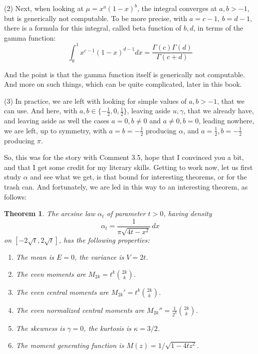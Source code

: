 \documentclass[12pt]{amsbook}
\newtheorem{theorem}{Theorem}[chapter]
\begin{document}
\bigskip

(2) Next, when looking at $\mu=x^a(1-x)^b$, the integral converges at $a,b>-1$, but is generically not computable. To be more precise, with $a=c-1$, $b=d-1$, there is a formula for this integral, called beta function of $b,d$, in terms of the gamma function:
$$\int_0^1x^{c-1}(1-x)^{d-1}dx=\frac{\Gamma(c)\Gamma(d)}{\Gamma(c+d)}$$

And the point is that the gamma function itself is generically not computable. And more on such things, which can be quite complicated, later in this book.

\bigskip

(3) In practice, we are left with looking for simple values of $a,b>-1$, that we can use. And here, with $a,b\in\{-\frac{1}{2},0,\frac{1}{2}\}$, leaving aside $u,\gamma$, that we already have, and leaving aside as well the cases $a=0,b\neq0$ and $a\neq 0,b=0$, leading nowhere, we are left, up to symmetry, with $a=b=-\frac{1}{2}$ producing $\alpha$, and $a=\frac{1}{2},b=-\frac{1}{2}$ producing $\pi$.

\bigskip

So, this was for the story with Comment 3.5, hope that I convinced you a bit, and that I get some credit for my literary skills. Getting to work now, let us first study $\alpha$ and see what we get, is that bound for interesting theorems, or for the trash can. And fortunately, we are led in this way to an interesting theorem, as follows:


\begin{theorem}
The arcsine law $\alpha_t$ of parameter $t>0$, having density
$$\alpha_t=\frac{1}{\pi\sqrt{4t-x^2}}\,dx$$
on $[-2\sqrt{t},2\sqrt{t}]$, has the following properties:
\begin{enumerate}
\item The mean is $E=0$, the variance is $V=2t$.

\item The even moments are $M_{2k}=t^k\binom{2k}{k}$.

\item The even central moments are $M_{2k}'=t^k\binom{2k}{k}$.

\item The even normalized central moments are $M_{2k}''=\frac{1}{2^k}\binom{2k}{k}$.

\item The skewness is $\gamma=0$, the kurtosis is $\kappa=3/2$.

\item The moment generating function is $M(z)=1/\sqrt{1-4tz^2}$.
\end{enumerate}
\end{theorem}
\end{document}
